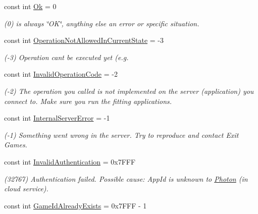 \begin{DoxyCompactItemize}
\item 
const int \hyperlink{class_exit_games_1_1_client_1_1_photon_1_1_chat_1_1_error_code_a432f4d428147b0455487dc2b28474e86}{Ok} = 0
\begin{DoxyCompactList}\small\item\em (0) is always \char`\"{}\+O\+K\char`\"{}, anything else an error or specific situation.\end{DoxyCompactList}\item 
const int \hyperlink{class_exit_games_1_1_client_1_1_photon_1_1_chat_1_1_error_code_abe840b6d5d214a382cc3126010610e61}{Operation\+Not\+Allowed\+In\+Current\+State} = -\/3
\begin{DoxyCompactList}\small\item\em (-\/3) Operation can\textquotesingle{}t be executed yet (e.\+g. \end{DoxyCompactList}\item 
const int \hyperlink{class_exit_games_1_1_client_1_1_photon_1_1_chat_1_1_error_code_a83ca01ddd4c0f0dd69c9ae9d135716dc}{Invalid\+Operation\+Code} = -\/2
\begin{DoxyCompactList}\small\item\em (-\/2) The operation you called is not implemented on the server (application) you connect to. Make sure you run the fitting applications.\end{DoxyCompactList}\item 
const int \hyperlink{class_exit_games_1_1_client_1_1_photon_1_1_chat_1_1_error_code_aa6418d5e27dd1c577387df71dbd2d97c}{Internal\+Server\+Error} = -\/1
\begin{DoxyCompactList}\small\item\em (-\/1) Something went wrong in the server. Try to reproduce and contact Exit Games.\end{DoxyCompactList}\item 
const int \hyperlink{class_exit_games_1_1_client_1_1_photon_1_1_chat_1_1_error_code_a020efa506a911d78481761219ad1a87a}{Invalid\+Authentication} = 0x7\+F\+FF
\begin{DoxyCompactList}\small\item\em (32767) Authentication failed. Possible cause\+: App\+Id is unknown to \hyperlink{namespace_exit_games_1_1_client_1_1_photon}{Photon} (in cloud service).\end{DoxyCompactList}\item 
const int \hyperlink{class_exit_games_1_1_client_1_1_photon_1_1_chat_1_1_error_code_a0f067e65b9ee1a19254cddf431cf7f73}{Game\+Id\+Already\+Exists} = 0x7\+F\+F\+F -\/ 1

\end{DoxyCompactItemize}
